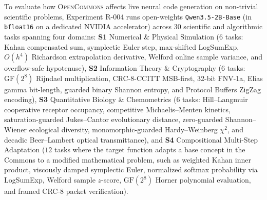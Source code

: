 \documentclass[10pt,twocolumn]{article}
\begin{document}
To evaluate how \textsc{OpenCommons} affects live neural code generation on non-trivial scientific problems, Experiment R-004 runs open-weights \texttt{Qwen3.5-2B-Base} (in \texttt{bfloat16} on a dedicated NVIDIA accelerator) across $30$ scientific and algorithmic tasks spanning four domains: \textbf{S1} Numerical \& Physical Simulation ($6$ tasks: Kahan compensated sum, symplectic Euler step, max-shifted LogSumExp, $O(h^4)$ Richardson extrapolation derivative, Welford online sample variance, and overflow-safe hypotenuse), \textbf{S2} Information Theory \& Cryptography ($6$ tasks: $\text{GF}(2^8)$ Rijndael multiplication, CRC-8-CCITT MSB-first, 32-bit FNV-1a, Elias gamma bit-length, guarded binary Shannon entropy, and Protocol Buffers ZigZag encoding), \textbf{S3} Quantitative Biology \& Chemometrics ($6$ tasks: Hill--Langmuir cooperative receptor occupancy, competitive Michaelis--Menten kinetics, saturation-guarded Jukes--Cantor evolutionary distance, zero-guarded Shannon--Wiener ecological diversity, monomorphic-guarded Hardy--Weinberg $\chi^2$, and decadic Beer--Lambert optical transmittance), and \textbf{S4} Compositional Multi-Step Adaptation ($12$ tasks where the target function adapts a base concept in the Commons to a modified mathematical problem, such as weighted Kahan inner product, viscously damped symplectic Euler, normalized softmax probability via LogSumExp, Welford sample $z$-score, $\text{GF}(2^8)$ Horner polynomial evaluation, and framed CRC-8 packet verification).
\end{document}
